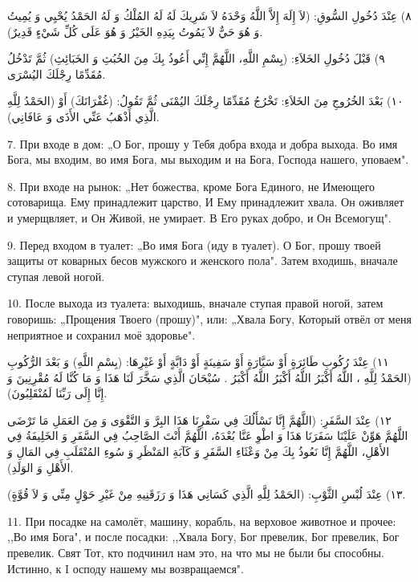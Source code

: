 \documentclass[a5paper]{article}
\begin{document}
٨) عِنْدَ دُخُولِ السُّوقِ: (لاَ إِلَهَ إِلاَّ اللَّهُ وَحْدَهُ لاَ شَرِيكَ لَهُ لَهُ المُلْكُ وَ لَهُ الحَمْدُ يُحْيِي وَ يُمِيتُ وَ هُوَ حَيٌّ لاَ يَمُوتُ بِيَدِهِ الخَيْرُ وَ هُوَ عَلَى كُلِّ شَيْءٍ قَدِيرٌ).

٩) قَبْلَ دُخُولِ الخَلاَءِ: (بِسْمِ اللَّهِ، اللَّهُمَّ إِنِّي أَعُوذُ بِكَ مِنَ الخُبُثِ وَ الخَبَائِثِ) ثُمَّ تَدْخُلُ مُقَدِّمًا رِجْلَكَ اليُسْرَى.

١٠) بَعْدَ الخُرُوجِ مِنَ الخَلاَءِ: تَخْرُجُ مُقَدِّمًا رِجْلَكَ اليُمْنَى ثُمَّ تَقُولُ: (غُفْرَانَكَ) أَوْ (الحَمْدُ لِلَّهِ الَّذِي أَذْهَبُ عَنِّي الأَذَى وَ عَافَانِي).

7. При входе в дом: „О Бог, прошу у Тебя добра входа и добра выхода. Во имя Бога, мы входим, во имя Бога, мы выходим и на Бога, Господа нашего, уповаем".

8. При входе на рынок: „Нет божества, кроме Бога Единого, не Имеющего сотоварища. Ему принадлежит царство, И Ему принадлежит хвала. Он оживляет и умерщвляет, и Он Живой, не умирает. В Его руках добро, и Он Всемогущ".

9. Перед входом в туалет: „Во имя Бога (иду в туалет). О Бог, прошу твоей защиты от коварных бесов мужского и женского пола". Затем входишь, вначале ступая левой ногой.

10. После выхода из туалета: выходишь, вначале ступая правой ногой, затем говоришь: „Прощения Твоего (прошу)", или: „Хвала Богу, Который отвёл от меня неприятное и сохранил моё здоровье".

١١) عِنْدَ رُكُوبِ طَائِرَةٍ أَوْ سَيَّارَةٍ أَوْ سَفِينَةٍ أَوْ دَابَّةٍ أَوْ غَيْرِهَا: (بِسْمِ اللَّهِ) وَ بَعْدَ الرُّكُوبِ (الحَمْدُ لِلَّهِ ، اللَّهُ أَكْبَرُ اللَّهُ أَكْبَرُ اللَّهُ أَكْبَرُ . سُبْحَانَ الَّذِي سَخَّرَ لَنَا هَذَا وَ مَا كُنَّا لَهُ مُقْرِنِينَ وَ إِنَّا إِلَى رَبِّنَا لَمُنْقَلِبُونَ).

١٢) عِنْدَ السَّفَرِ: (اللَّهُمَّ إِنَّا نَسْأَلُكَ فِي سَفْرِنَا هَذَا البِرَّ وَ التَّقْوَى وَ مِنَ العَمَلِ مَا تَرْضَى اللَّهُمَّ هَوِّنْ عَلَيْنَا سَفَرَنَا هَذَا وَ اطْوِ عَنَّا بُعْدَهُ، اللَّهُمَّ أَنْتَ الصَّاحِبُ فِي السَّفَرِ وَ الخَلِيفَةُ فِي الأَهْلِ، اللَّهُمَّ إِنَّا نَعُوذُ بِكَ مِنْ وَعْثَاءِ السَّفَرِ وَ كَآبَةِ المَنْظَرِ وَ سُوءِ المُنْقَلَبِ فِي المَالِ وَ الأَهْلِ وَ الوَلَدِ).

١٣) عِنْدَ لُبْسِ الثَّوْبِ: (الحَمْدُ لِلَّهِ الَّذِي كَسَانِي هَذَا وَ رَزَقَنِيهِ مِنْ غَيْرِ حَوْلٍ مِنِّي وَ لاَ قُوَّةٍ).

11. При посадке на самолёт, машину, корабль, на верховое животное и прочее: ,,Во имя Бога", и после посадки: ,,Хвала Богу, Бог превелик, Бог превелик, Бог превелик. Свят Тот, кто подчинил нам это, на что мы не были бы способны. Истинно, к I осподу нашему мы возвращаемся".
\end{document}
